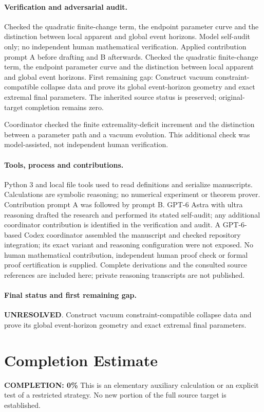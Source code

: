 \documentclass[11pt]{article}
\begin{document}
\paragraph{Verification and adversarial audit.}
Checked the quadratic finite-change term, the endpoint parameter curve and the distinction between local apparent and global event horizons. Model self-audit only; no independent human mathematical verification. Applied contribution prompt A before drafting and B afterwards. Checked the quadratic finite-change term, the endpoint parameter curve and the distinction between local apparent and global event horizons. First remaining gap: Construct vacuum constraint-compatible collapse data and prove its global event-horizon geometry and exact extremal final parameters. The inherited source status is preserved; original-target completion remains zero.

Coordinator checked the finite extremality-deficit increment and the distinction between a parameter path and a vacuum evolution. This additional check was model-assisted, not independent human verification.

\paragraph{Tools, process and contributions.}
Python 3 and local file tools used to read definitions and serialize manuscripts. Calculations are symbolic reasoning; no numerical experiment or theorem prover. Contribution prompt A was followed by prompt B. GPT-6 Astra with ultra reasoning drafted the research and performed its stated self-audit; any additional coordinator contribution is identified in the verification and audit. A GPT-6-based Codex coordinator assembled the manuscript and checked repository integration; its exact variant and reasoning configuration were not exposed. No human mathematical contribution, independent human proof check or formal proof certification is supplied. Complete derivations and the consulted source references are included here; private reasoning transcripts are not published.

\paragraph{Final status and first remaining gap.}
\textbf{UNRESOLVED}. Construct vacuum constraint-compatible collapse data and prove its global event-horizon geometry and exact extremal final parameters.

\section{Completion Estimate}
\noindent\textbf{COMPLETION: 0\%}
This is an elementary auxiliary calculation or an explicit test of a restricted strategy. No new portion of the full source target is established.
\end{document}
